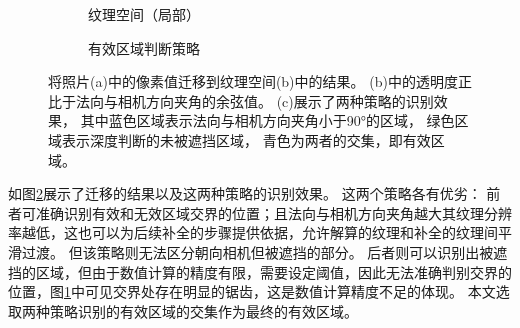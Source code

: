 \begin{figure}
\begin{subfigure}{5.8cm}
\begin{tikzpicture}
\end{tikzpicture}%
\caption{纹理空间（局部）}
\end{subfigure}%
\begin{subfigure}{5.8cm}
\caption{有效区域判断策略}
\label{fig:unwrap_strategy}
\end{subfigure}
\caption[纹理迁移结果]{
    将照片(a)中的像素值迁移到纹理空间(b)中的结果。
    (b)中的透明度正比于法向与相机方向夹角的余弦值。
    (c)展示了两种策略的识别效果，
    其中蓝色区域表示法向与相机方向夹角小于90°的区域，
    绿色区域表示深度判断的未被遮挡区域，
    青色为两者的交集，即有效区域。
}
\label{fig:unwrap_result}
\end{figure}
如图\ref{fig:unwrap_result}展示了迁移的结果以及这两种策略的识别效果。
这两个策略各有优劣：
前者可准确识别有效和无效区域交界的位置；且法向与相机方向夹角越大其纹理分辨率越低，这也可以为后续补全的步骤提供依据，允许解算的纹理和补全的纹理间平滑过渡。
但该策略则无法区分朝向相机但被遮挡的部分。
后者则可以识别出被遮挡的区域，但由于数值计算的精度有限，需要设定阈值，因此无法准确判别交界的位置，图\ref{fig:unwrap_strategy}中可见交界处存在明显的锯齿，这是数值计算精度不足的体现。
本文选取两种策略识别的有效区域的交集作为最终的有效区域。

